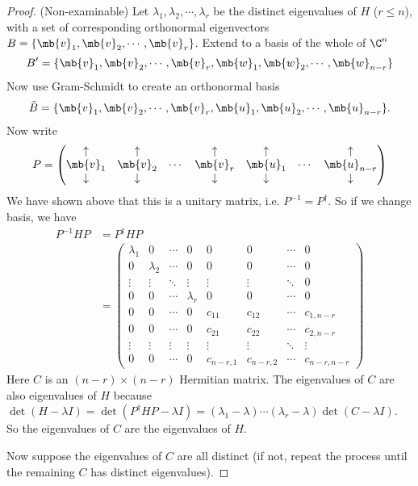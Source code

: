 \documentclass[a4paper]{article}
\begin{document}
\begin{proof}
  (Non-examinable) Let $\lambda_1,\lambda_2, \cdots, \lambda_r$ be the distinct eigenvalues of $H$ ($r \leq n$), with a set of corresponding orthonormal eigenvectors $B = \{\mb{v}_1, \mb{v}_2, \cdots, \mb{v}_r\}$. Extend to a basis of the whole of $\C^n$
\[
B' = \{\mb{v}_1, \mb{v}_2, \cdots, \mb{v}_r, \mb{w}_1, \mb{w}_2,\cdots, \mb{w}_{n - r}\}
\]
Now use Gram-Schmidt to create an orthonormal basis
\[
\tilde{B} = \{\mb{v}_1, \mb{v}_2, \cdots, \mb{v}_r, \mb{u}_1, \mb{u}_2, \cdots, \mb{u}_{n - r}\}.
\]
Now write
\[
P = 
\begin{pmatrix}
  \uparrow & \uparrow & & \uparrow  & \uparrow & & \uparrow\\
  \mb{v}_1 & \mb{v}_2 & \cdots & \mb{v}_r & \mb{u}_1 & \cdots & \mb{u}_{n - r}\\
  \downarrow & \downarrow & & \downarrow  & \downarrow & & \downarrow\\
\end{pmatrix}
\]
We have shown above that this is a unitary matrix, i.e. $P^{-1} = P^\dagger$. So if we change basis, we have
\begin{align*}
  P^{-1}HP &= P^\dagger HP\\
  &= \begin{pmatrix}
    \lambda_1 & 0 & \cdots & 0 & 0 & 0 & \cdots & 0\\
    0 & \lambda_2 & \cdots & 0 & 0 & 0 & \cdots & 0\\
    \vdots & \vdots & \ddots & \vdots & \vdots & \vdots & \ddots & 0\\
    0 & 0 & \cdots & \lambda_r & 0 & 0 & \cdots & 0\\
    0 & 0 & \cdots & 0 & c_{11} & c_{12} & \cdots & c_{1, n - r}\\
    0 & 0 & \cdots & 0 & c_{21} & c_{22} & \cdots & c_{2, n - r}\\
    \vdots & \vdots & \vdots & \vdots & \vdots & \vdots & \ddots & \vdots \\
    0 & 0 & \cdots & 0 & c_{n - r,1} & c_{n - r,2} & \cdots  & c_{n - r, n - r}
  \end{pmatrix}
\end{align*}
Here $C$ is an $(n - r)\times (n - r)$ Hermitian matrix. The eigenvalues of $C$ are also eigenvalues of $H$ because $\det (H - \lambda I) = \det(P^\dagger HP - \lambda I) = (\lambda_1 - \lambda)\cdots (\lambda_r - \lambda)\det (C - \lambda I)$. So the eigenvalues of $C$ are the eigenvalues of $H$.

Now suppose the eigenvalues of $C$ are all distinct (if not, repeat the process until the remaining $C$ has distinct eigenvalues).


\end{proof}
\end{document}
